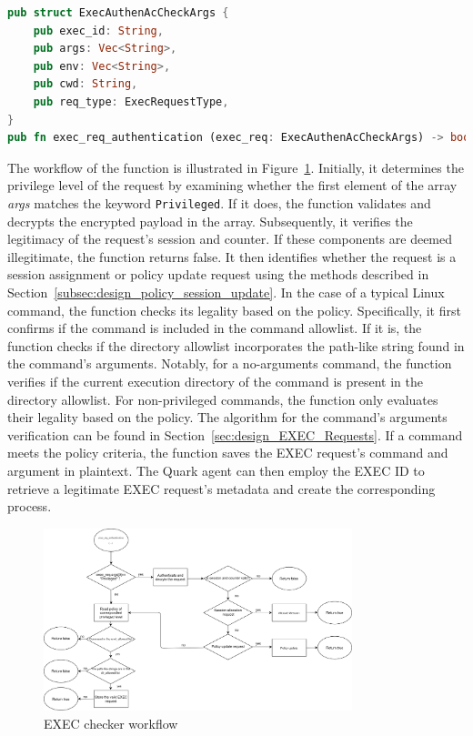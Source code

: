 \begin{lstlisting}[language=rust, caption= API of EXEC checker, label={lst:exec_Cheker}]
pub struct ExecAuthenAcCheckArgs {
    pub exec_id: String,
    pub args: Vec<String>,
    pub env: Vec<String>,
    pub cwd: String,
    pub req_type: ExecRequestType,
}
pub fn exec_req_authentication (exec_req: ExecAuthenAcCheckArgs) -> bool
\end{lstlisting}

The workflow of the function is illustrated in Figure~\ref{fig:exec_req_authentication_flow_chart}. Initially, it determines the privilege level of the request by examining whether the first element of the array \emph{args} matches the keyword \texttt{Privileged}. If it does, the function 
validates and decrypts the encrypted payload in the array. Subsequently, it verifies the legitimacy of the request's session and counter. If these components are deemed illegitimate, the function returns false. It then identifies whether the request is a session assignment or policy update request 
using the methods described in Section~\ref{subsec:design_policy_session_update}. In the case of a typical Linux command, the function checks its legality based on the policy. Specifically, it first confirms if the command is included in the command allowlist. If it is, the function checks if the 
directory allowlist incorporates the path-like string found in the command's arguments. Notably, for a no-arguments command, the function verifies if the current execution directory of the command is present in the directory allowlist. For non-privileged commands, the function only evaluates 
their legality based on the policy. The algorithm for the command's arguments verification can be found in Section~\ref{sec:design_EXEC_Requests}. If a command meets the policy criteria, the function saves the EXEC request's command and argument in plaintext. The Quark agent can then employ 
the EXEC ID to retrieve a legitimate EXEC request's metadata and create the corresponding process.

\begin{figure}[!htb]
    \centering
    \includegraphics[width=0.8\textwidth]{images/exec_req_authentication_flow_chart.png}
    \caption[EXEC checker workflow]{EXEC checker workflow}
    \label{fig:exec_req_authentication_flow_chart}
\end{figure}

